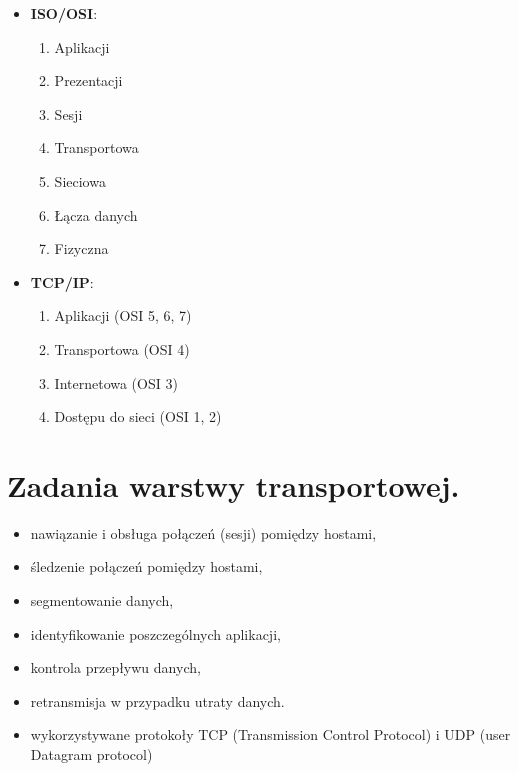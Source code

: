\documentclass[12pt,a4paper]{article}
\begin{document}
	\begin{multicols}{2}
		\begin{itemize}
			\item \textbf{ISO/OSI}:
			\begin{enumerate}
				\item Aplikacji
				\item Prezentacji
				\item Sesji
				\item Transportowa
				\item Sieciowa
				\item Łącza danych
				\item Fizyczna	
			\end{enumerate}
		
			\columnbreak
			
			\item \textbf{TCP/IP}:
			\begin{enumerate}
				\item Aplikacji (OSI 5, 6, 7)
				\item Transportowa (OSI 4)
				\item Internetowa (OSI 3)
				\item Dostępu do sieci (OSI 1, 2)
			\end{enumerate}
		
			\vfill\null
		\end{itemize}
	\end{multicols}
	

	\section{Zadania warstwy transportowej.}
	\begin{itemize}
		\item nawiązanie i obsługa połączeń (sesji) pomiędzy hostami,
		\item śledzenie połączeń pomiędzy hostami,
		\item segmentowanie danych,
		\item identyfikowanie poszczególnych aplikacji,
		\item kontrola przepływu danych,
		\item retransmisja w przypadku utraty danych.
		\item wykorzystywane protokoły TCP (Transmission Control Protocol) i UDP (user Datagram protocol)
	\end{itemize}
\end{document}
